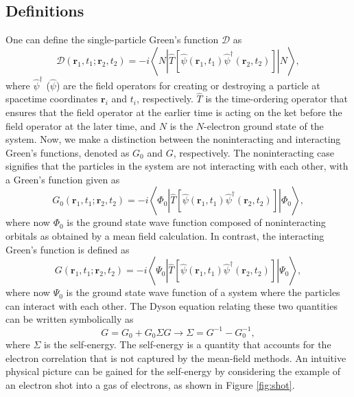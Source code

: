 \documentclass[12pt]{caltech_thesis}
\begin{document}
\subsection{Definitions}
One can define the single-particle Green's function $\mathcal{D}$ as
\begin{equation}
\mathcal{D}\left(\mathbf{r}_1, t_1 ; \mathbf{r}_2, t_2\right)=-i\left\langle N\left|\hat{T}\left[\hat{\psi }\left(\mathbf{r}_1, t_1\right) \hat{\psi }^{\dagger}\left(\mathbf{r}_2, t_2\right)\right]\right|  N\right\rangle,
\end{equation}
where $\hat{\psi }^{\dagger}$ ($\hat{\psi }$) are the field operators for creating or destroying a particle at spacetime coordinates $\mathbf{r}_{i}$ and $t_{i}$, respectively. $\hat{T}$ is the time-ordering operator that ensures that the field operator at the earlier time is acting on the ket before the field operator at the later time, and $N$ is the $N$-electron ground state of the system. Now, we make a distinction between the noninteracting and interacting Green's functions, denoted as $G_0$ and $G$, respectively. The noninteracting case signifies that the particles in the system are not interacting with each other, with a Green's function given as
\begin{equation}
G_0\left(\mathbf{r}_1, t_1 ; \mathbf{r}_2, t_2\right)=-i\left\langle\Phi_0\left|\hat{T}\left[\hat{\psi }\left(\mathbf{r}_1, t_1\right) \hat{\psi }^{\dagger}\left(\mathbf{r}_2, t_2\right)\right]\right| \Phi_0\right\rangle,
\end{equation}
where now $\Phi_0$ is the ground state wave function composed of noninteracting orbitals as obtained by a mean field calculation. In contrast, the interacting Green's function is defined as
\begin{equation}
G\left(\mathbf{r}_1, t_1 ; \mathbf{r}_2, t_2\right)=-i\left\langle \Psi _0\left|\hat{T}\left[\hat{\psi }\left(\mathbf{r}_1, t_1\right) \hat{\psi }^{\dagger}\left(\mathbf{r}_2, t_2\right)\right]\right|  \Psi _0\right\rangle,
\end{equation}
where now $\Psi_0$ is the ground state wave function of a system where the particles can interact with each other.
 The Dyson equation relating these two quantities can be written symbolically as \autocite{bruneval_assessment_2019}
\begin{equation}
G=G_0+G_0\Sigma G \rightarrow \Sigma = G^{-1}-G_0^{-1},
\label{eqn:dyson}
\end{equation}
where $\Sigma$ is the self-energy. The self-energy is a quantity that accounts for the electron correlation that is not captured by the mean-field methods. An intuitive physical picture can be gained for the self-energy by considering the example of an electron shot into a gas of electrons, as shown in Figure \ref{fig:shot}.
\end{document}
